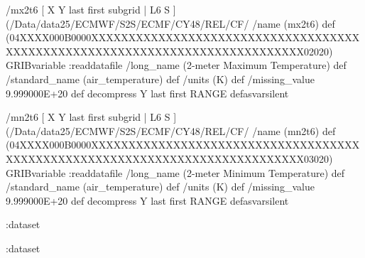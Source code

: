 \begin{ingrid}
/mx2t6 { [ X Y last first subgrid | L6 S ] (/Data/data25/ECMWF/S2S/ECMF/CY48/REL/CF/%
/name (mx2t6) def
(04XXXX000B0000XXXXXXXXXXXXXXXXXXXXXXXXXXXXXXXXXXXXXXXXXXXXXXXXXXXXXXXXXXXXXXXXXXXXXXXXXXXX02020) GRIBvariable
:readdatafile
/long_name (2-meter Maximum Temperature) def
/standard_name (air_temperature) def
/units (K) def
/missing_value 9.999000E+20 def
decompress
Y last first RANGE
} defasvarsilent

/mn2t6 { [ X Y last first subgrid | L6 S ] (/Data/data25/ECMWF/S2S/ECMF/CY48/REL/CF/%
/name (mn2t6) def
(04XXXX000B0000XXXXXXXXXXXXXXXXXXXXXXXXXXXXXXXXXXXXXXXXXXXXXXXXXXXXXXXXXXXXXXXXXXXXXXXXXXXX03020) GRIBvariable
:readdatafile
/long_name (2-meter Minimum Temperature) def
/standard_name (air_temperature) def
/units (K) def
/missing_value 9.999000E+20 def
decompress
Y last first RANGE
} defasvarsilent


:dataset

:dataset

\end{ingrid}

